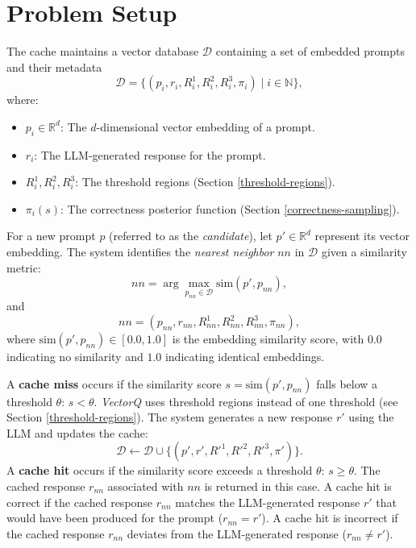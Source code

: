 
\newcommand{\alex}[1]{{\color{brown}{\bf\sf [alex: #1]}}}

\section{Problem Setup}
The cache maintains a vector database $\mathcal{D}$ containing a set of embedded prompts and their metadata \[
\mathcal{D} = \{(p_i, r_i, R_i^{1}, R_i^{2}, R_i^{3}, \pi_i) \mid i \in \mathbb{N}\},
\]
where:
\begin{itemize}
    \item $p_i \in \mathbb{R}^d$: The $d$-dimensional vector embedding of a prompt.
    \item $r_i$: The LLM-generated response for the prompt.
    \item $R_i^{1}, R_i^{2}, R_i^{3}$: The threshold regions (Section \ref{threshold-regions}).
    \item $\pi_i(s)$: The correctness posterior function (Section \ref{correctness-sampling}).
\end{itemize}

For a new prompt $p$ (referred to as the \textit{candidate}), let $p' \in \mathbb{R}^d$ represent its vector embedding. The system identifies the \textit{nearest neighbor} $nn$ in $\mathcal{D}$ given a similarity metric:
\[
nn = \arg \max_{p_{nn} \in \mathcal{D}} \text{sim}(p', p_{nn}),
\]
and
\[
nn = (p_{nn}, r_{nn}, R_{nn}^{1}, R_{nn}^{2}, R_{nn}^{3}, \pi_{nn}),
\]
where $\text{sim}(p', p_{nn}) \in [0.0, 1.0]$ is the embedding similarity score, with $0.0$ indicating no similarity and $1.0$ indicating identical embeddings. 

A \textbf{cache miss} occurs if the similarity score $s = \text{sim}(p', p_{nn})$ falls below a threshold $\theta$: $s < \theta$. \textit{VectorQ} uses threshold regions instead of one threshold (see Section \ref{threshold-regions}). The system generates a new response $r'$ using the LLM and updates the cache:
\[
\mathcal{D} \gets \mathcal{D} \cup \{(p', r', R'^{1}, R'^{2}, R'^{3}, \pi')\}.
\]
A \textbf{cache hit} occurs if the similarity score exceeds a threshold $\theta$: $s \geq \theta$. The cached response $r_{nn}$ associated with $nn$ is returned in this case. A cache hit is correct if the cached response $r_{nn}$ matches the LLM-generated response $r'$ that would have been produced for the prompt ($r_{nn} = r'$). A cache hit is incorrect if the cached response $r_{nn}$ deviates from the LLM-generated response ($r_{nn} \neq r'$).


